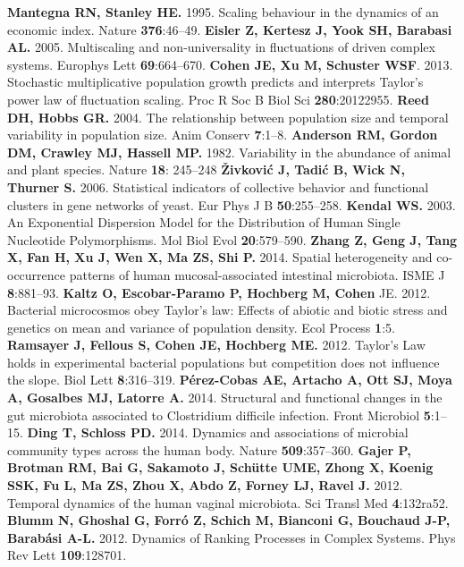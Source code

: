 \documentclass[12pt,oneside,letterpaper]{article}
\begin{document}
\begin{thebibliography}{99}
 {\bf Mantegna RN, Stanley HE.} 1995. Scaling behaviour in the dynamics of an economic index. Nature {\bf 376}:46–49.
 {\bf Eisler Z, Kertesz J, Yook SH, Barabasi AL.} 2005. Multiscaling and non-universality in fluctuations of driven complex systems. Europhys Lett {\bf 69}:664–670.
 {\bf Cohen JE, Xu M, Schuster WSF}. 2013. Stochastic multiplicative population growth predicts and interprets Taylor’s power law of fluctuation scaling. Proc R Soc B Biol Sci {\bf 280}:20122955.
 {\bf Reed DH, Hobbs GR.} 2004. The relationship between population size and temporal variability in population size. Anim Conserv {\bf 7}:1–8.
 {\bf Anderson RM, Gordon DM, Crawley MJ, Hassell MP.} 1982. Variability in the abundance of animal and plant species. Nature {\bf 18}: 245–248
 {\bf Živković J, Tadić B, Wick N, Thurner S.} 2006. Statistical indicators of collective behavior and functional clusters in gene networks of yeast. Eur Phys J B {\bf 50}:255–258.
 {\bf Kendal WS.} 2003. An Exponential Dispersion Model for the Distribution of Human Single Nucleotide Polymorphisms. Mol Biol Evol {\bf 20}:579–590.
 {\bf Zhang Z, Geng J, Tang X, Fan H, Xu J, Wen X, Ma ZS, Shi P.} 2014. Spatial heterogeneity and co-occurrence patterns of human mucosal-associated intestinal microbiota. ISME J {\bf 8}:881–93.
 {\bf Kaltz O, Escobar-Paramo P, Hochberg M, Cohen} JE. 2012. Bacterial microcosmos obey Taylor’s law: Effects of abiotic and biotic stress and genetics on mean and variance of population density. Ecol Process {\bf 1}:5.
 {\bf Ramsayer J, Fellous S, Cohen JE, Hochberg ME.} 2012. Taylor’s Law holds in experimental bacterial populations but competition does not influence the slope. Biol Lett {\bf 8}:316–319.
 {\bf Pérez-Cobas AE, Artacho A, Ott SJ, Moya A, Gosalbes MJ, Latorre A.} 2014. Structural and functional changes in the gut microbiota associated to Clostridium difficile infection. Front Microbiol {\bf 5}:1–15.
 {\bf Ding T, Schloss PD.} 2014. Dynamics and associations of microbial community types across the human body. Nature {\bf 509}:357–360.
 {\bf Gajer P, Brotman RM, Bai G, Sakamoto J, Schütte UME, Zhong X, Koenig SSK, Fu L, Ma ZS, Zhou X, Abdo Z, Forney LJ, Ravel J.} 2012. Temporal dynamics of the human vaginal microbiota. Sci Transl Med {\bf 4}:132ra52.
 {\bf Blumm N, Ghoshal G, Forró Z, Schich M, Bianconi G, Bouchaud J-P, Barabási A-L.} 2012. Dynamics of Ranking Processes in Complex Systems. Phys Rev Lett {\bf 109}:128701.


\end{thebibliography}
\end{document}
